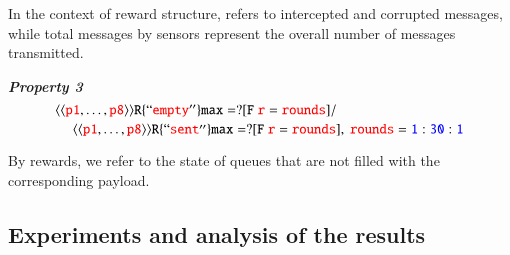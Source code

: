 In the context of reward structure,  refers to intercepted and corrupted messages, while total messages  by sensors represent the overall number of messages transmitted.
        
 
	   
	    \begin{resp}{\textbf{\textit{Property 3}}}
        \begin{equation}
        \label{eq3}
        \splitdfrac{\mathtt{ \gl{\gl{\textcolor{red}{p1},\ldots,\textcolor{red}{p8}}}R{\{\quot{\textcolor{red}{empty}}\}}max=? [ F \ \textcolor{red}{r}=\textcolor{red}{rounds} ]/}}{\mathtt{\ \gl{\gl{\textcolor{red}{p1},\ldots,\textcolor{red}{p8}}}R{ \{\quot{\textcolor{red}{sent}}\}}max=? [ F\ \textcolor{red}{r}=\textcolor{red}{rounds} ],  \ \textcolor{red}{rounds}=\textcolor{blue}{1}:\textcolor{blue}{30}:\textcolor{blue}{1}}}
        \end{equation}
        \end{resp}
       
        
By  rewards, we refer to the state of queues that are not filled with the corresponding payload.   

\subsection{Experiments and analysis of the results}

